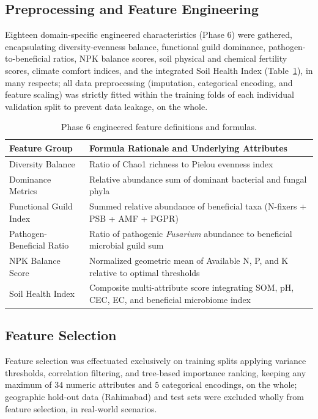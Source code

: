 \documentclass[runningheads,a4paper,oribibl]{llncs}
\begin{document}
\subsection{Preprocessing and Feature Engineering}
Eighteen domain-specific engineered characteristics (Phase 6) were gathered, encapsulating diversity-evenness balance, functional guild dominance, pathogen-to-beneficial ratios, NPK balance scores, soil physical and chemical fertility scores, climate comfort indices, and the integrated Soil Health Index (Table~\ref{tab:eng_features}), in many respects; all data preprocessing (imputation, categorical encoding, and feature scaling) was strictly fitted within the training folds of each individual validation split to prevent data leakage, on the whole.

\begin{table}[t]
\caption{Phase 6 engineered feature definitions and formulas.}
\label{tab:eng_features}
\centering
\begin{tabular}{lp{7.2cm}}
\hline
Feature Group & Formula Rationale and Underlying Attributes \\
\hline
Diversity Balance & Ratio of Chao1 richness to Pielou evenness index \\
Dominance Metrics & Relative abundance sum of dominant bacterial and fungal phyla \\
Functional Guild Index & Summed relative abundance of beneficial taxa (N-fixers + PSB + AMF + PGPR) \\
Pathogen-Beneficial Ratio & Ratio of pathogenic \textit{Fusarium} abundance to beneficial microbial guild sum \\
NPK Balance Score & Normalized geometric mean of Available N, P, and K relative to optimal thresholds \\
Soil Health Index & Composite multi-attribute score integrating SOM, pH, CEC, EC, and beneficial microbiome index \\
\hline
\end{tabular}
\end{table}

\subsection{Feature Selection}
Feature selection was effectuated exclusively on training splits applying variance thresholds, correlation filtering, and tree-based importance ranking, keeping any maximum of $34$ numeric attributes and $5$ categorical encodings, on the whole; geographic hold-out data (Rahimabad) and test sets were excluded wholly from feature selection, in real-world scenarios.
\end{document}
